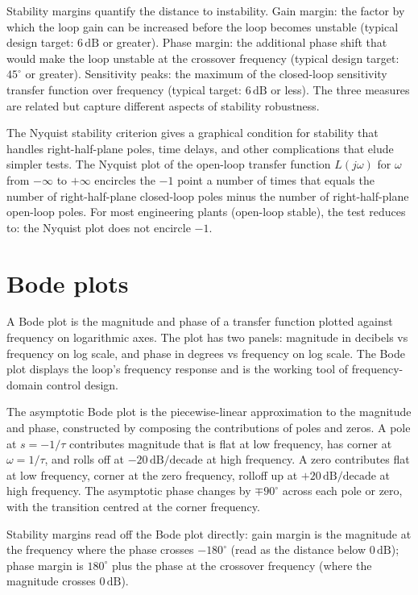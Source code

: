 Stability margins quantify the distance to instability. Gain margin: the factor by which the loop gain can be increased before the loop becomes unstable (typical design target: $6\,\text{dB}$ or greater). Phase margin: the additional phase shift that would make the loop unstable at the crossover frequency (typical design target: $45^\circ$ or greater). Sensitivity peaks: the maximum of the closed-loop sensitivity transfer function over frequency (typical target: $6\,\text{dB}$ or less). The three measures are related but capture different aspects of stability robustness.

The Nyquist stability criterion gives a graphical condition for stability that handles right-half-plane poles, time delays, and other complications that elude simpler tests. The Nyquist plot of the open-loop transfer function $L(j\omega)$ for $\omega$ from $-\infty$ to $+\infty$ encircles the $-1$ point a number of times that equals the number of right-half-plane closed-loop poles minus the number of right-half-plane open-loop poles. For most engineering plants (open-loop stable), the test reduces to: the Nyquist plot does not encircle $-1$.

\section{Bode plots}

A Bode plot is the magnitude and phase of a transfer function plotted against frequency on logarithmic axes. The plot has two panels: magnitude in decibels vs frequency on log scale, and phase in degrees vs frequency on log scale. The Bode plot displays the loop's frequency response and is the working tool of frequency-domain control design.

The asymptotic Bode plot is the piecewise-linear approximation to the magnitude and phase, constructed by composing the contributions of poles and zeros. A pole at $s = -1/\tau$ contributes magnitude that is flat at low frequency, has corner at $\omega = 1/\tau$, and rolls off at $-20\,\text{dB/decade}$ at high frequency. A zero contributes flat at low frequency, corner at the zero frequency, rolloff up at $+20\,\text{dB/decade}$ at high frequency. The asymptotic phase changes by $\mp 90^\circ$ across each pole or zero, with the transition centred at the corner frequency.

Stability margins read off the Bode plot directly: gain margin is the magnitude at the frequency where the phase crosses $-180^\circ$ (read as the distance below $0\,\text{dB}$); phase margin is $180^\circ$ plus the phase at the crossover frequency (where the magnitude crosses $0\,\text{dB}$).


